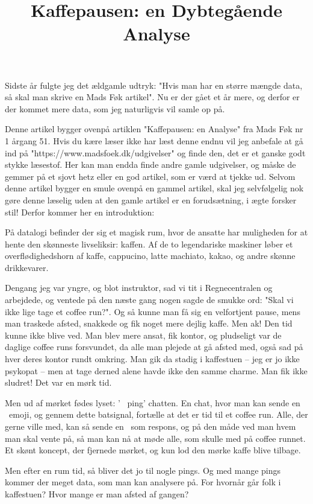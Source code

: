 \documentclass{article}
\title{Kaffepausen: en Dybtegående Analyse}
\author{}
\date{}
\newlength\myheight
\newlength\mydepth
\newcommand*\inlinegraphics[1]{%
  \settototalheight\myheight{Xygp}%
  \settodepth\mydepth{Xygp}%
  \raisebox{-\mydepth}{\texttt{[image: \#1]}}%
}
\newcommand{\coffee}[0]{\inlinegraphics{coffee.png}}
\begin{document}
\maketitle

Sidste år fulgte jeg det ældgamle udtryk: "Hvis man har en større mængde data, så skal man skrive en Mads Føk artikel". Nu er der gået et år mere, og derfor er der kommet mere data, som jeg naturligvis vil samle op på.

Denne artikel bygger ovenpå artiklen "Kaffepausen: en Analyse" fra Mads Føk nr 1 årgang 51. Hvis du kære læser ikke har læst denne endnu vil jeg anbefale at gå ind på "https://www.madsfoek.dk/udgivelser" og finde den, det er et ganske godt stykke læsestof. Her kan man endda finde andre gamle udgivelser, og måske de gemmer på et sjovt hetz eller en god artikel, som er værd at tjekke ud.
Selvom denne artikel bygger en smule ovenpå en gammel artikel, skal jeg selvfølgelig nok gøre denne læselig uden at den gamle artikel er en forudsætning, i ægte forsker stil!
Derfor kommer her en introduktion:

På datalogi befinder der sig et magisk rum, hvor de ansatte har muligheden for at hente den skønneste livseliksir: kaffen. Af de to legendariske maskiner løber et overflødighedshorn af kaffe, cappucino, latte machiato, kakao, og andre skønne drikkevarer.

Dengang jeg var yngre, og blot instruktor, sad vi tit i Regnecentralen og arbejdede, og ventede på den næste gang nogen sagde de smukke ord: "Skal vi ikke lige tage et coffee run?". Og så kunne man få sig en velfortjent pause, mens man traskede afsted, snakkede og fik noget mere dejlig kaffe. Men ak! Den tid kunne ikke blive ved. Man blev mere ansat, fik kontor, og pludseligt var de daglige coffee runs forsvundet, da alle man plejede at gå afsted med, også sad på hver deres kontor rundt omkring. Man gik da stadig i kaffestuen -- jeg er jo ikke psykopat -- men at tage derned alene havde ikke den samme charme. Man fik ikke sludret! Det var en mørk tid.

Men ud af mørket fødes lyset: '\coffee\ ping' chatten.
En chat, hvor man kan sende en \coffee\ emoji, og gennem dette batsignal, fortælle at det er tid til et coffee run. Alle, der gerne ville med, kan så sende en \coffee\ som respons, og på den måde ved man hvem man skal vente på, så man kan nå at møde alle, som skulle med på coffee runnet. Et skønt koncept, der fjernede mørket, og kun lod den mørke kaffe blive tilbage.

Men efter en rum tid, så bliver det jo til nogle pings. Og med mange pings kommer der meget data, som man kan analysere på. For hvornår går folk i kaffestuen? Hvor mange er man afsted af gangen?
\end{document}
